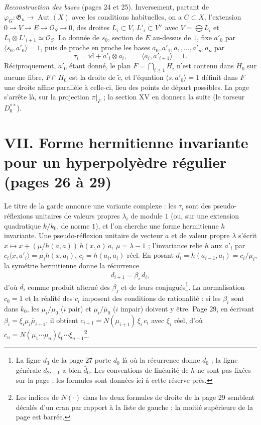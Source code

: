 \documentclass[11pt,a4paper]{article}
\begin{document}
\emph{Reconstruction des bases} (pages 24 et 25). Inversement, partant de
$\varphi_G \colon \mathfrak{G}_n \to \operatorname{Aut}(X)$ avec les conditions
habituelles, on a $C \subset X$, l'extension $0 \to V \to E \to \mathcal{O}_S
\to 0$, des droites $L_i \subset V$, $L'_i \subset V^\vee$ avec $V =
\bigoplus L_i$ et $L_i \otimes L'_{i+1} \simeq \mathcal{O}_S$. La donnée de
$s_0$, section de $E$ au-dessus de $1$, fixe $a'_0$ par $\langle s_0, a'_0
\rangle = 1$, puis de proche en proche les bases $a_0, a'_1, a_1, \ldots,
a'_n, a_n$ par
\[
\tau_i = \mathrm{id} + a'_i \otimes a_i , \qquad \langle a_i, a'_{i+1}
\rangle = 1 .
\]
Réciproquement, $a'_0$ étant donné, le plan $F = \bigcap_{i \geqslant 1} H_i$
n'est contenu dans $H_0$ sur aucune fibre, $F \cap H_0$ est la droite de
$\tilde c$, et l'équation $\langle s, a'_0 \rangle = 1$ définit dans $F$ une
droite affine parallèle à celle-ci, lieu des points de départ possibles. La
page s'arrête là, sur la projection $\pi|_F$ ; la section XV en donnera la
suite (le torseur $D_0^{**}$).

\section*{VII. Forme hermitienne invariante pour un hyperpolyèdre régulier (pages 26 à 29)}

Le titre de la garde annonce une variante complexe : les $\tau_i$ sont des
pseudo-réflexions unitaires de valeurs propres $\lambda_i$ de module $1$ (ou,
sur une extension quadratique $k/k_0$, de norme $1$), et l'on cherche une forme
hermitienne $h$ invariante. Une pseudo-réflexion unitaire de vecteur $a$ et de
valeur propre $\lambda$ s'écrit $x \mapsto x + (\mu/h(a, a))\, h(x, a)\, a$,
$\mu = \lambda - 1$ ; l'invariance relie $h$ aux $a'_i$ par $c_i \langle x,
a'_i \rangle = \mu_i h(x, a_i)$, $c_i = h(a_i, a_i)$ réel. En posant $d_i =
h(a_{i-1}, a_i) = c_i/\mu_i$, la symétrie hermitienne donne la récurrence
\[
d_{i+1} = \bar\beta_i\, \bar d_i ,
\]
d'où $d_i$ comme produit alterné des $\beta_j$ et de leurs conjugués\footnote{La
ligne $d_3$ de la page 27 porte $d_0$ là où la récurrence donne $\bar d_0$ ;
la ligne générale $d_{2i+1}$ a bien $\bar d_0$. Les conventions de linéarité de
$h$ ne sont pas fixées sur la page ; les formules sont données ici à cette
réserve près.}. La normalisation $c_0 = 1$ et la réalité des $c_i$ imposent
des conditions de rationalité : si les $\beta_i$ sont dans $k_0$, les
$\mu_i/\mu_0$ ($i$ pair) et $\mu_i/\bar\mu_0$ ($i$ impair) doivent y être.
Page 29, en écrivant $\beta_i = \xi_i\mu_i\bar\mu_{i+1}$, il obtient $c_{i+1}
= N(\mu_{i+1})\,\xi_i\, c_i$ avec $\xi_i$ réel, d'où $c_n = N(\mu_1 \cdots \mu_n)
\xi_0 \cdots \xi_{n-1}$\footnote{Les indices de $N(\cdot)$ dans les deux
formules de droite de la page 29 semblent décalés d'un cran par rapport à la
liste de gauche ; la moitié supérieure de la page est barrée.}.
\end{document}
